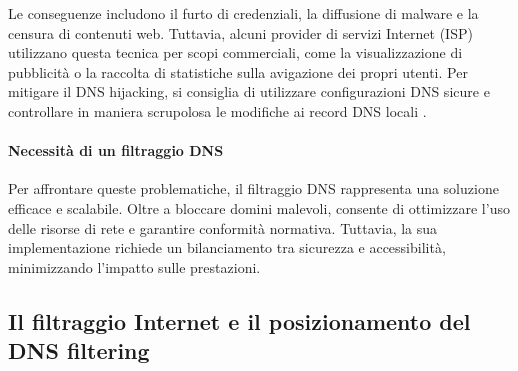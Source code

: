 Le conseguenze includono il furto di credenziali, la diffusione di malware e la censura di contenuti web. Tuttavia, alcuni provider di servizi Internet (ISP) utilizzano questa tecnica per scopi commerciali, come la visualizzazione di pubblicità o la raccolta di statistiche sulla avigazione dei propri utenti. Per mitigare il DNS hijacking, si consiglia di utilizzare configurazioni DNS sicure e controllare in maniera scrupolosa le modifiche ai record DNS locali \cite{hudaib2014dns}.

\paragraph{Necessità di un filtraggio DNS}
Per affrontare queste problematiche, il filtraggio DNS rappresenta una soluzione efficace e scalabile. Oltre a bloccare domini malevoli, consente di ottimizzare l'uso delle risorse di rete e garantire conformità normativa. Tuttavia, la sua implementazione richiede un bilanciamento tra sicurezza e accessibilità, minimizzando l'impatto sulle prestazioni.

\subsection{Il filtraggio Internet e il posizionamento del DNS filtering}
